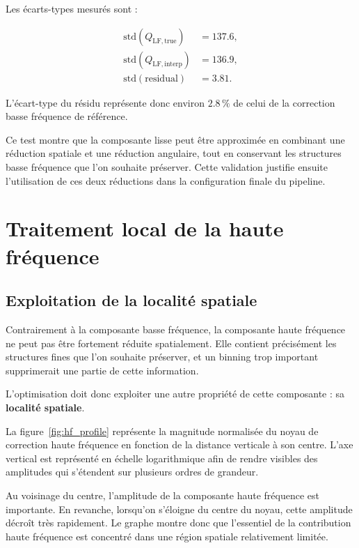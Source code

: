 \documentclass[11pt,a4paper]{report}
\begin{document}
Les écarts-types mesurés sont :

\begin{align}
\mathrm{std}(Q_{\mathrm{LF,true}}) &= 137.6,\\
\mathrm{std}(Q_{\mathrm{LF,interp}}) &= 136.9,\\
\mathrm{std}(\mathrm{residual}) &= 3.81.
\end{align}

L'écart-type du résidu représente donc environ $2.8\,\%$ de celui de la
correction basse fréquence de référence.

Ce test montre que la composante lisse peut être approximée en combinant
une réduction spatiale et une réduction angulaire, tout en conservant les
structures basse fréquence que l'on souhaite préserver. Cette validation
justifie ensuite l'utilisation de ces deux réductions dans la configuration
finale du pipeline.


\chapter{Traitement local de la haute fréquence}

\section{Exploitation de la localité spatiale}

Contrairement à la composante basse fréquence, la composante haute
fréquence ne peut pas être fortement réduite spatialement. Elle contient
précisément les structures fines que l'on souhaite préserver, et un binning
trop important supprimerait une partie de cette information.

L'optimisation doit donc exploiter une autre propriété de cette
composante : sa \textbf{\textcolor{ESRFblue}{localité spatiale}}.

La figure~\ref{fig:hf_profile} représente la magnitude normalisée du noyau
de correction haute fréquence en fonction de la distance verticale à son
centre. L'axe vertical est représenté en échelle logarithmique afin de
rendre visibles des amplitudes qui s'étendent sur plusieurs ordres de
grandeur.

Au voisinage du centre, l'amplitude de la composante haute fréquence est
importante. En revanche, lorsqu'on s'éloigne du centre du noyau, cette
amplitude décroît très rapidement. Le graphe montre donc que l'essentiel de
la contribution haute fréquence est concentré dans une région spatiale
relativement limitée.
\end{document}
